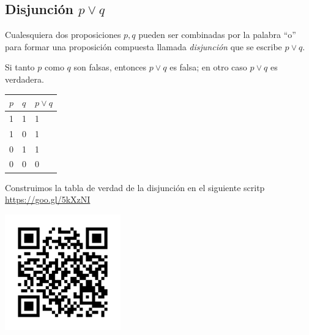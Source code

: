 \subsection{Disjunci\'on $p \vee q$}


    Cualesquiera dos proposiciones $p,q$ pueden ser combinadas por la palabra ``o'' para formar una proposici\'on compuesta llamada \emph{disjunci\'on} que se escribe $p \vee q .$



    \begin{defn}
        Si tanto $p$ como $q$ son falsas, entonces $p \vee q$ es falsa; en otro caso $p\vee q$ es verdadera.
    \end{defn}
    




    \begin{tdv}[Disjunci\'on]
        \label{tdv:or}
        \begin{center}
            \begin{tabular}{|l|l|l|}\hline
                $p$ & $q$ & $p \vee q$\\\hline
                1 & 1 & 1\\\hline
                1 & 0 & 1\\\hline
                0 & 1 & 1\\\hline
                0 & 0 & 0\\\hline
            \end{tabular}
        \end{center}
        
    \end{tdv}
    



    Construimos la tabla de verdad de la disjunci\'on en el siguiente scritp \href{https://cloud.sagemath.com/projects/12787063-cafe-4f3b-a2e0-905f8b83cf3b/files/MD01_TDV02_OR.sagews}{https://goo.gl/5kXzNI}
    \begin{center}
        \includegraphics[height=5cm,keepaspectratio=true]{./md/MD01_TDV02_OR.png}
    \end{center}
    



